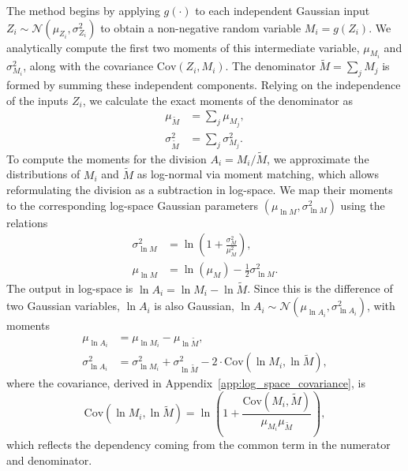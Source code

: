 \documentclass{uai2026} %
\begin{document}
The method begins by applying $g(\cdot)$ to each independent Gaussian input $Z_i \sim \mathcal{N}(\mu_{Z_i}, \sigma_{Z_i}^2)$ to obtain a non-negative random variable $M_i = g(Z_i)$. We analytically compute the first two moments of this intermediate variable, $\mu_{M_i}$ and $\sigma_{M_i}^2$, along with the covariance $\text{Cov}(Z_i, M_i)$. The denominator $\tilde{M} = \sum_j M_j$ is formed by summing these independent components. Relying on the independence of the inputs $Z_i$, we calculate the exact moments of the denominator as
\begin{align*}
\mu_{\tilde{M}} &= \sum_j \mu_{M_j},\\
\sigma_{\tilde{M}}^2 &= \sum_j \sigma_{M_j}^2.
\end{align*}
To compute the moments for the division $A_i = M_i / \tilde{M}$, we approximate the distributions of $M_i$ and $\tilde{M}$ as log-normal via moment matching, which allows reformulating the division as a subtraction in log-space. We map their moments to the corresponding log-space Gaussian parameters $(\mu_{\ln M}, \sigma_{\ln M}^2)$ using the relations
\begin{align*}
\sigma_{\ln{M}}^2 &= \ln\left(1+\frac{\sigma_{M}^2}{\mu_{M}^2}\right),\\
\mu_{\ln{M}} &= \ln(\mu_{M}) - \frac{1}{2}\sigma_{\ln{M}}^2.
\end{align*}
The output in log-space is $\ln A_i = \ln M_i - \ln \tilde{M}$. Since this is the difference of two Gaussian variables, $\ln A_i$ is also Gaussian, $\ln A_i \sim \mathcal{N}(\mu_{\ln A_i}, \sigma_{\ln A_i}^2)$, with moments
\begin{align*}
\mu_{\ln A_i} &= \mu_{\ln M_i} - \mu_{\ln \tilde{M}},\\
\sigma_{\ln A_i}^2 &= \sigma_{\ln M_i}^2 + \sigma_{\ln\tilde{M}}^2 - 2 \cdot \text{Cov} (\ln M_{i}, \ln\tilde{M}),
\end{align*}
where the covariance, derived in Appendix~\ref{app:log_space_covariance}, is 
$$\text{Cov} (\ln M_{i}, \ln\tilde{M}) = \ln\left(1 + \frac{\text{Cov}(M_i, \tilde{M})}{\mu_{M_i}\mu_{\tilde{M}}}\right),$$ 
which reflects the dependency coming from the common term in the numerator and denominator.
\end{document}
